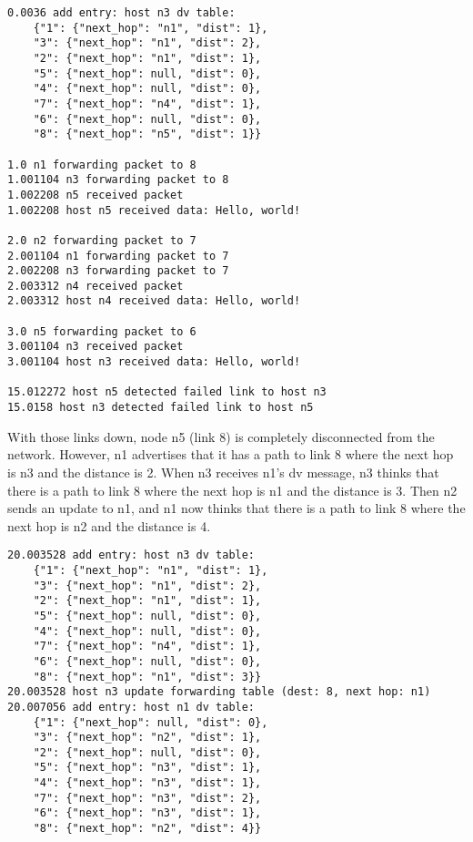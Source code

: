 \documentclass[11pt]{article}
\begin{document}
\begin{lstlisting}
0.0036 add entry: host n3 dv table:
	{"1": {"next_hop": "n1", "dist": 1},
	"3": {"next_hop": "n1", "dist": 2},
	"2": {"next_hop": "n1", "dist": 1},
	"5": {"next_hop": null, "dist": 0},
	"4": {"next_hop": null, "dist": 0},
	"7": {"next_hop": "n4", "dist": 1},
	"6": {"next_hop": null, "dist": 0},
	"8": {"next_hop": "n5", "dist": 1}}

1.0 n1 forwarding packet to 8
1.001104 n3 forwarding packet to 8
1.002208 n5 received packet
1.002208 host n5 received data: Hello, world!

2.0 n2 forwarding packet to 7
2.001104 n1 forwarding packet to 7
2.002208 n3 forwarding packet to 7
2.003312 n4 received packet
2.003312 host n4 received data: Hello, world!

3.0 n5 forwarding packet to 6
3.001104 n3 received packet
3.001104 host n3 received data: Hello, world!

15.012272 host n5 detected failed link to host n3
15.0158 host n3 detected failed link to host n5
\end{lstlisting}

With those links down, node n5 (link 8) is completely disconnected from the network. However, n1 advertises that it has a path to link 8 where the next hop is n3 and the distance is 2. When n3 receives n1's dv message, n3 thinks that there is a path to link 8 where the next hop is n1 and the distance is 3. Then n2 sends an update to n1, and n1 now thinks that there is a path to link 8 where the next hop is n2 and the distance is 4.

\begin{lstlisting}
20.003528 add entry: host n3 dv table:
	{"1": {"next_hop": "n1", "dist": 1},
	"3": {"next_hop": "n1", "dist": 2},
	"2": {"next_hop": "n1", "dist": 1},
	"5": {"next_hop": null, "dist": 0},
	"4": {"next_hop": null, "dist": 0},
	"7": {"next_hop": "n4", "dist": 1},
	"6": {"next_hop": null, "dist": 0},
	"8": {"next_hop": "n1", "dist": 3}}
20.003528 host n3 update forwarding table (dest: 8, next hop: n1)
20.007056 add entry: host n1 dv table:
	{"1": {"next_hop": null, "dist": 0},
	"3": {"next_hop": "n2", "dist": 1},
	"2": {"next_hop": null, "dist": 0},
	"5": {"next_hop": "n3", "dist": 1},
	"4": {"next_hop": "n3", "dist": 1},
	"7": {"next_hop": "n3", "dist": 2},
	"6": {"next_hop": "n3", "dist": 1},
	"8": {"next_hop": "n2", "dist": 4}}
\end{lstlisting}
\end{document}
